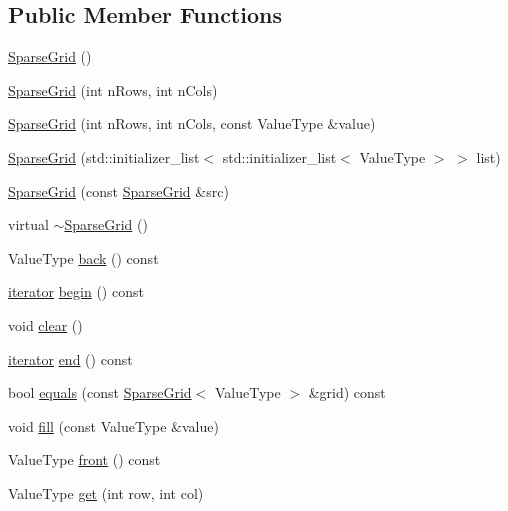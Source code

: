 \subsection*{Public Member Functions}
\begin{DoxyCompactItemize}
\item 
\mbox{\hyperlink{classSparseGrid_aa3e62bd1aaaaaa299dd7679cf577c1bd}{Sparse\+Grid}} ()
\item 
\mbox{\hyperlink{classSparseGrid_acc9a9175eb75e387baf77fb35611ef5f}{Sparse\+Grid}} (int n\+Rows, int n\+Cols)
\item 
\mbox{\hyperlink{classSparseGrid_aa3750390e26b86ba32a14380f09c2001}{Sparse\+Grid}} (int n\+Rows, int n\+Cols, const Value\+Type \&value)
\item 
\mbox{\hyperlink{classSparseGrid_ac955816d45630530ec172f0bcf4ccb6e}{Sparse\+Grid}} (std\+::initializer\+\_\+list$<$ std\+::initializer\+\_\+list$<$ Value\+Type $>$ $>$ list)
\item 
\mbox{\hyperlink{classSparseGrid_a6962f2939ac810b43b2e4b31fda92cc0}{Sparse\+Grid}} (const \mbox{\hyperlink{classSparseGrid}{Sparse\+Grid}} \&src)
\item 
virtual \mbox{\hyperlink{classSparseGrid_a833c6d823380fd8995407d94bde29a5d}{$\sim$\+Sparse\+Grid}} ()
\item 
Value\+Type \mbox{\hyperlink{classSparseGrid_a38cbd80c93f450dc9bf3ca7c6a6220bd}{back}} () const
\item 
\mbox{\hyperlink{classSparseGrid_1_1iterator}{iterator}} \mbox{\hyperlink{classSparseGrid_a0c62c15c8ed609e7e5e9518cf5f5c712}{begin}} () const
\item 
void \mbox{\hyperlink{classSparseGrid_ac8bb3912a3ce86b15842e79d0b421204}{clear}} ()
\item 
\mbox{\hyperlink{classSparseGrid_1_1iterator}{iterator}} \mbox{\hyperlink{classSparseGrid_a68b688a51bd0cf6fb5bc2cba292209a8}{end}} () const
\item 
bool \mbox{\hyperlink{classSparseGrid_a900e9c2eb274257965a3d2160c73d9ff}{equals}} (const \mbox{\hyperlink{classSparseGrid}{Sparse\+Grid}}$<$ Value\+Type $>$ \&grid) const
\item 
void \mbox{\hyperlink{classSparseGrid_ac8f8ff1a5d0997596cbedbc2162e4649}{fill}} (const Value\+Type \&value)
\item 
Value\+Type \mbox{\hyperlink{classSparseGrid_abaa174a9d74f7e7e38d4944fa43b5a33}{front}} () const
\item 
Value\+Type \mbox{\hyperlink{classSparseGrid_a49fcb88bae29483f4cb0858f29f6384e}{get}} (int row, int col)

\end{DoxyCompactItemize}
